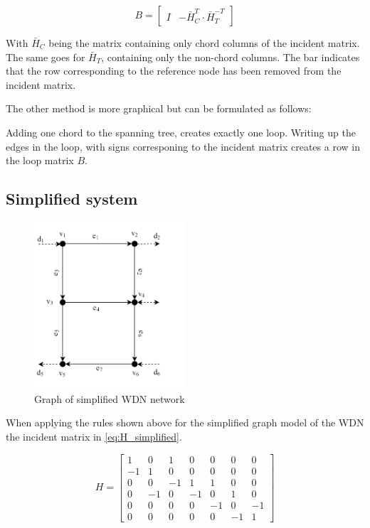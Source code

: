 \begin{equation}\label{eq:LoopMatrix}
	B = \begin{bmatrix}
		I & -\bar{H}_{C}^{T}\cdot\bar{H}_{T}^{-T}
	\end{bmatrix}
\end{equation}


With $\bar{H}_{C}$ being the matrix containing only chord columns of the incident matrix. The same goes for  $\bar{H}_{T}$, containing only the non-chord columns. The bar indicates that the row corresponding to the reference node has been removed from the incident matrix.

The other method is more graphical but can be formulated as follows: 

Adding one chord to the spanning tree, creates exactly one loop. Writing up the edges in the loop, with signs corresponing to the incident matrix creates a row in the loop matrix $ B $. 


\newpage
\subsection{Simplified system}
\begin{figure}[h!]
	\centering
	\includegraphics[width=0.5\textwidth]{Pictures/Graph.png}
	\caption{Graph of simplified WDN network \cite{Rathore930}}
	\label{fig:graph}
\end{figure}

When applying the rules shown above for the simplified graph model of the WDN the incident matrix in \cref{eq:H_simplified}.

\begin{equation}
	H = \begin{bmatrix}
		1 & 0 & 1 & 0 & 0 & 0 & 0\\
		-1 & 1 & 0 & 0 & 0 & 0 & 0\\
		0 & 0 & -1 & 1 & 1 & 0 & 0\\
		0 & -1 & 0 & -1 & 0 & 1 & 0\\
		0 & 0 & 0 & 0 & -1 &  0  & -1\\
		0 & 0 & 0 & 0 & 0 & -1 & 1
	\end{bmatrix}
	\label{eq:H_simplified}
\end{equation} %


